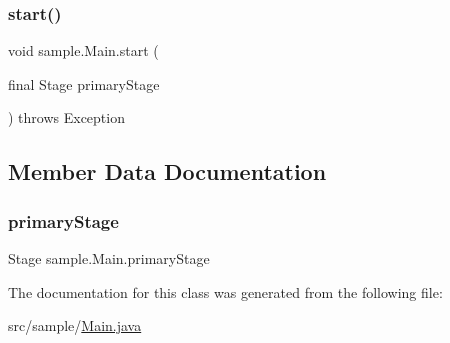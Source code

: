\mbox{\label{classsample_1_1Main_a2e2d592e66658f0457efe1962feb1577}} 
\subsubsection{\texorpdfstring{start()}{start()}}
{\footnotesize\ttfamily void sample.\+Main.\+start (\begin{DoxyParamCaption}\item[{final Stage}]{primary\+Stage }\end{DoxyParamCaption}) throws Exception\hspace{0.3cm}{\ttfamily [inline]}}



\subsection{Member Data Documentation}
\mbox{\label{classsample_1_1Main_a5e113cf7a365730d2659060da1461ba3}} 
\subsubsection{\texorpdfstring{primary\+Stage}{primaryStage}}
{\footnotesize\ttfamily Stage sample.\+Main.\+primary\+Stage\hspace{0.3cm}{\ttfamily [static]}}



The documentation for this class was generated from the following file\+:\begin{DoxyCompactItemize}
\item 
src/sample/\hyperlink{Main_8java}{Main.\+java}\end{DoxyCompactItemize}
